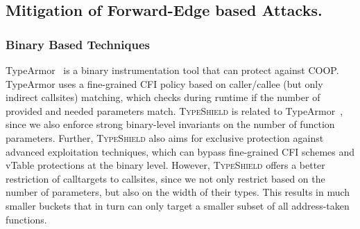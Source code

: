 \subsection{Mitigation of Forward-Edge based Attacks.}
\label{Mitigation of Advanced Code-Reuse Attacks}

\subsubsection{Binary Based Techniques}

TypeArmor~\cite{veen:typearmor} is a binary instrumentation tool that can protect against COOP.
TypeArmor uses a fine-grained CFI policy based on caller/callee (but only indirect callsites) matching, which checks 
during runtime if the number of provided and needed parameters match.
\textsc{TypeShield} is related to TypeArmor~\cite{veen:typearmor}, since we also enforce strong binary-level 
invariants on the number of function parameters. Further, \textsc{TypeShield} also aims for exclusive protection 
against advanced exploitation techniques, which can bypass fine-grained CFI schemes and vTable protections at the 
binary level. However, \textsc{TypeShield} offers a better restriction of calltargets to callsites, since we not 
only restrict based on the number of parameters, but also on the width of their types. This results in much smaller 
buckets that in turn can only target a smaller subset of all address-taken functions. 


